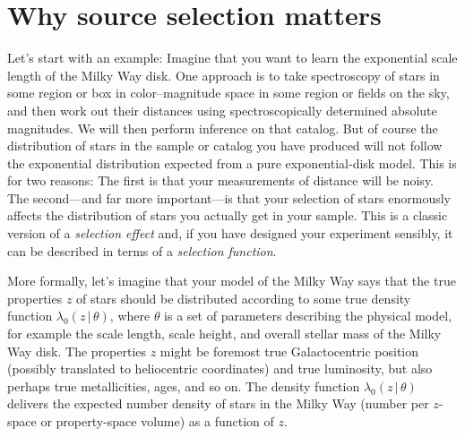 \documentclass[modern]{aastex62}
\newcommand{\given}{\,|\,}
\begin{document}

\section*{}\clearpage
\section{Why source selection matters}\label{sec:intro}

Let's start with an example:
Imagine that you want to learn the exponential scale length of the
Milky Way disk.
One approach is to take spectroscopy of stars in some region or box in
color--magnitude space in some region or fields on the sky, and then
work out their distances using spectroscopically determined absolute
magnitudes.
We will then perform inference on that catalog.
But of course the distribution of stars in the sample or catalog you have produced will not
follow the exponential distribution expected from a pure exponential-disk
model.
This is for two reasons:
The first is that your measurements of distance will be noisy.
The second---and far more important---is that your selection of stars
enormously affects the distribution of stars
you actually get in your sample.
This is a classic version of a \emph{selection effect} and, if you
have designed your experiment sensibly, it can be described in terms of a
\emph{selection function}.

More formally, let's imagine that your model of the Milky Way says
that the true properties $z$ of stars should be distributed
according to some true density function $\lambda_0(z\given\theta)$,
where $\theta$ is a set of parameters describing the physical model,
for example the scale length, scale height, and overall stellar mass
of the Milky Way disk.
The properties $z$ might be foremost true Galactocentric position
(possibly translated to heliocentric coordinates) and true luminosity,
but also perhaps true metallicities, ages, and so on.
The density function $\lambda_0(z\given\theta)$ delivers the expected
number density of stars in the Milky Way (number per $z$-space or
property-space volume) as a function of $z$.
\end{document}
